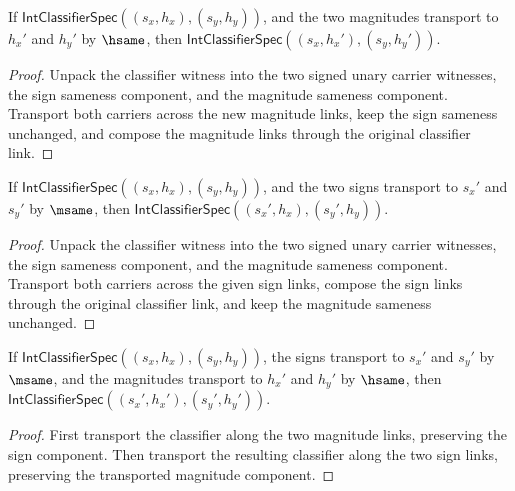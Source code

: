 \begin{theorem}
\label{thm:int-classifier-hsame-magnitude-transport}
If \(\mathsf{IntClassifierSpec}((s_x,h_x),(s_y,h_y))\), and the two
magnitudes transport to \(h_x'\) and \(h_y'\) by \(\hsame\), then
\(\mathsf{IntClassifierSpec}((s_x,h_x'),(s_y,h_y'))\).
\end{theorem}
\begin{proof}
Unpack the classifier witness into the two signed unary carrier witnesses,
the sign sameness component, and the magnitude sameness component. Transport
both carriers across the new magnitude links, keep the sign sameness
unchanged, and compose the magnitude links through the original classifier
link.
\end{proof}

\begin{theorem}
\label{thm:int-classifier-msame-sign-transport}
If \(\mathsf{IntClassifierSpec}((s_x,h_x),(s_y,h_y))\), and the two
signs transport to \(s_x'\) and \(s_y'\) by \(\msame\), then
\(\mathsf{IntClassifierSpec}((s_x',h_x),(s_y',h_y))\).
\end{theorem}
\begin{proof}
Unpack the classifier witness into the two signed unary carrier witnesses,
the sign sameness component, and the magnitude sameness component. Transport
both carriers across the given sign links, compose the sign links through the
original classifier link, and keep the magnitude sameness unchanged.
\end{proof}

\begin{theorem}
\label{thm:int-classifier-sign-magnitude-transport}
If $\mathsf{IntClassifierSpec}((s_x,h_x),(s_y,h_y))$, the signs transport to
$s_x'$ and $s_y'$ by $\msame$, and the magnitudes transport to $h_x'$ and
$h_y'$ by $\hsame$, then
$\mathsf{IntClassifierSpec}((s_x',h_x'),(s_y',h_y'))$.
\end{theorem}
\begin{proof}
First transport the classifier along the two magnitude links, preserving the
sign component. Then transport the resulting classifier along the two sign
links, preserving the transported magnitude component.
\end{proof}

